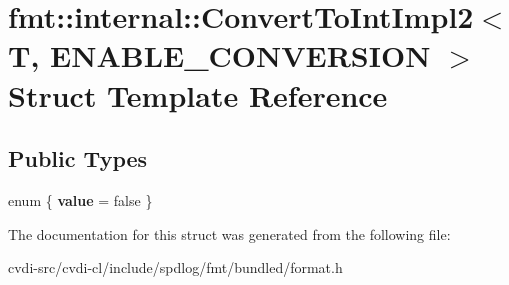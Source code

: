 \hypertarget{structfmt_1_1internal_1_1ConvertToIntImpl2}{}\section{fmt\+:\+:internal\+:\+:Convert\+To\+Int\+Impl2$<$ T, E\+N\+A\+B\+L\+E\+\_\+\+C\+O\+N\+V\+E\+R\+S\+I\+ON $>$ Struct Template Reference}
\label{structfmt_1_1internal_1_1ConvertToIntImpl2}
\subsection*{Public Types}
\begin{DoxyCompactItemize}
\item 
enum \{ {\bfseries value} = false
 \}\hypertarget{structfmt_1_1internal_1_1ConvertToIntImpl2_ab5fa04e67a4fe10fadc0c6d46837c053}{}\label{structfmt_1_1internal_1_1ConvertToIntImpl2_ab5fa04e67a4fe10fadc0c6d46837c053}

\end{DoxyCompactItemize}


The documentation for this struct was generated from the following file\+:\begin{DoxyCompactItemize}
\item 
cvdi-\/src/cvdi-\/cl/include/spdlog/fmt/bundled/format.\+h\end{DoxyCompactItemize}
